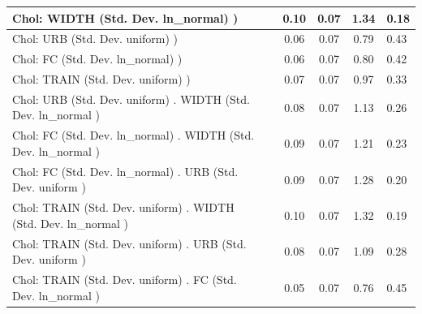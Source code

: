 \begin{table}
\begin{center}
\begin{tabular}{|l|l|c|c|c|l|}
			\hline
			 Chol: WIDTH (Std. Dev. ln_normal) ) &  & 0.10 & 0.07 & 1.34 & 0.18 \\
			\hline
			 Chol: URB (Std. Dev. uniform) ) &  & 0.06 & 0.07 & 0.79 & 0.43 \\
			\hline
			 Chol: FC (Std. Dev. ln_normal) ) &  & 0.06 & 0.07 & 0.80 & 0.42 \\
			\hline
			 Chol: TRAIN (Std. Dev. uniform) ) &  & 0.07 & 0.07 & 0.97 & 0.33 \\
			\hline
			 Chol: URB (Std. Dev. uniform) . WIDTH (Std. Dev.   ln_normal ) &  & 0.08 & 0.07 & 1.13 & 0.26 \\
			\hline
			 Chol: FC (Std. Dev. ln_normal) . WIDTH (Std. Dev.   ln_normal ) &  & 0.09 & 0.07 & 1.21 & 0.23 \\
			\hline
			 Chol: FC (Std. Dev. ln_normal) . URB (Std. Dev.   uniform ) &  & 0.09 & 0.07 & 1.28 & 0.20 \\
			\hline
			 Chol: TRAIN (Std. Dev. uniform) . WIDTH (Std. Dev.   ln_normal ) &  & 0.10 & 0.07 & 1.32 & 0.19 \\
			\hline
			 Chol: TRAIN (Std. Dev. uniform) . URB (Std. Dev.   uniform ) &  & 0.08 & 0.07 & 1.09 & 0.28 \\
			\hline
			 Chol: TRAIN (Std. Dev. uniform) . FC (Std. Dev.   ln_normal ) &  & 0.05 & 0.07 & 0.76 & 0.45 \\
			\hline
		\end{tabular}
	\end{center}
\end{table}